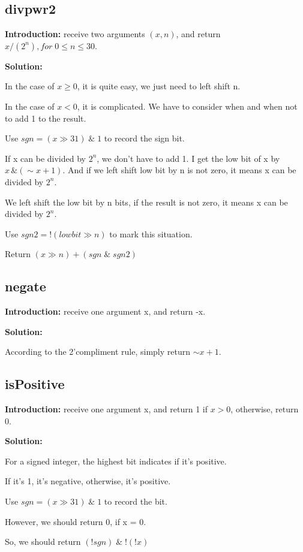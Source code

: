 \documentclass[12pt,a4paper]{article}
\theoremstyle{definition}
\numberwithin{equation}{section}
\numberwithin{figure}{section}
\begin{document}
\begin{spacing}{1.5}
\subsection{divpwr2}
\textbf{Introduction: }receive two arguments $\left(x, n\right)$, and return $x/\left(2^{n}\right), for\;0 \leq n \leq 30$.\par
\textbf{Solution: }\par
In the case of $x \geq 0$, it is quite easy, we just need to left shift n.\par
In the case of $x < 0$, it is complicated. We have to consider when and when not to add 1 to the result.\par
Use $sgn = \left(x \gg 31\right)\;\&\;1$ to record the sign bit.\par
If x can be divided by $2^{n}$, we don't have to add 1. I get the low bit of x by $x\,\&\left(\sim x + 1\right)$. And if we left shift low bit by n is not zero, it means x can be divided by $2^{n}$.\par
We left shift the low bit by n bits, if the result is not zero, it means x can be divided by $2^{n}$.\par
Use $sgn2 = !\left(lowbit \gg n\right)$ to mark this situation.\par
Return $\left(x \gg n\right) + \left(sgn\;\&\;sgn2\right)$

\subsection{negate}
\textbf{Introduction: }receive one argument x, and return -x.\par
\textbf{Solution: }\par
According to the 2'compliment rule, simply return $\sim x + 1$.\par

\subsection{isPositive}
\textbf{Introduction: }receive one argument x, and return 1 if $x > 0$, otherwise, return 0.\par
\textbf{Solution: }\par
For a signed integer, the highest bit indicates if it's positive.\par
If it's 1, it's negative, otherwise, it's positive.\par
Use $sgn = \left(x \gg 31\right)\;\&\;1$ to record the bit.\par
However, we should return 0, if x = 0.\par
So, we should return $\left(!sgn\right)\;\&\; !\left(!x\right)$


\end{spacing}
\end{document}
